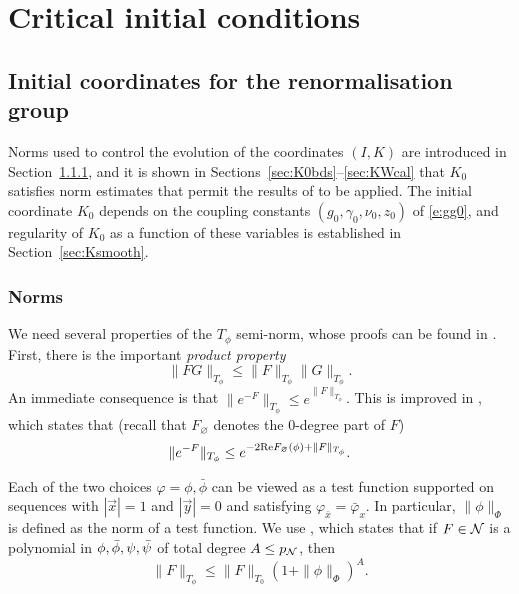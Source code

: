 \chapter{Critical initial conditions}


\section{Initial coordinates for the renormalisation group}
\label{sec:K0bd}

Norms used to control the evolution of the coordinates $(I, K)$ are introduced
in Section~\ref{sec:norms}, and it is shown in
Sections~\ref{sec:K0bds}--\ref{sec:KWcal} that $K_0$ satisfies norm estimates
that permit the results of \cite{BS-rg-step,BBS-rg-flow} to be applied.
The initial coordinate $K_0$
depends on the coupling constants $(g_0, \gamma_0, \nu_0, z_0)$
of \eqref{e:gg0}, and regularity of $K_0$ as a function of these variables
is established in Section~\ref{sec:Ksmooth}.


\subsection{Norms}
\label{sec:norms}

We need several properties of the $T_\phi$ semi-norm,
whose proofs can be found in \cite{BS-rg-norm}.
First, there is the important \emph{product property}
\cite[Proposition~\ref{norm-prop:prod}]{BS-rg-norm}
\begin{equation}
\label{e:prod}
\|F G\|_{T_\phi} \leq \|F\|_{T_\phi} \|G\|_{T_\phi}.
\end{equation}
An immediate consequence is that $\|e^{-F}\|_{T_\phi} \leq e^{\|F\|_{T_\phi}}$.
This is improved in \cite[Proposition~\ref{norm-prop:eK}]{BS-rg-norm},
which states that (recall that $F_\varnothing$ denotes the $0$-degree part of $F$)
\begin{equation}
\label{e:eK}
\|e^{-F}\|_{T_\phi} \leq e^{-2 {\rm Re} F_\varnothing(\phi) + \|F\|_{T_\phi}}.
\end{equation}

Each of the two choices $\varphi = \phi, \bar\phi$
can be viewed as a test function supported on sequences with
$|\vec x| = 1$ and $|\vec y| = 0$
and satisfying $\varphi_{\bar x} = \bar\varphi_x$.
In particular, $\|\phi\|_\Phi$ is defined as the norm of a test function.
We use \cite[Proposition~\ref{norm-prop:T0K}]{BS-rg-norm},
which states that if $F \in \mathcal{N}$ is a polynomial in $\phi,\bar\phi,\psi,\bar\psi$ of
total degree $A \leq p_{\mathcal{N}}$, then
\begin{equation}
\label{e:T0K}
\|F\|_{T_\phi} \leq \|F\|_{T_0} (1 + \|\phi\|_\Phi)^A.
\end{equation}

